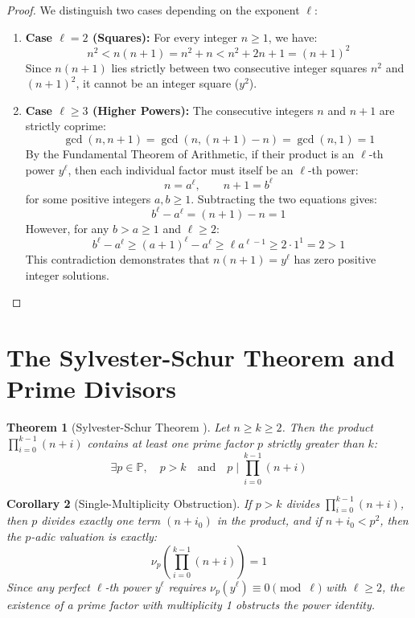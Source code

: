 \documentclass[11pt,a4paper]{article}
\newtheorem{theorem}{Theorem}[section]
\newtheorem{corollary}[theorem]{Corollary}
\theoremstyle{definition}
\begin{document}
\begin{proof}
We distinguish two cases depending on the exponent $\ell$:
\begin{enumerate}
    \item \textbf{Case $\ell = 2$ (Squares):}
    For every integer $n \ge 1$, we have:
    \[ n^2 < n(n + 1) = n^2 + n < n^2 + 2n + 1 = (n + 1)^2 \]
    Since $n(n + 1)$ lies strictly between two consecutive integer squares $n^2$ and $(n + 1)^2$, it cannot be an integer square ($y^2$).
    
    \item \textbf{Case $\ell \ge 3$ (Higher Powers):}
    The consecutive integers $n$ and $n + 1$ are strictly coprime:
    \[ \gcd(n, n + 1) = \gcd(n, (n + 1) - n) = \gcd(n, 1) = 1 \]
    By the Fundamental Theorem of Arithmetic, if their product is an $\ell$-th power $y^\ell$, then each individual factor must itself be an $\ell$-th power:
    \[ n = a^\ell, \qquad n + 1 = b^\ell \]
    for some positive integers $a, b \ge 1$.
    Subtracting the two equations gives:
    \[ b^\ell - a^\ell = (n + 1) - n = 1 \]
    However, for any $b > a \ge 1$ and $\ell \ge 2$:
    \[ b^\ell - a^\ell \ge (a + 1)^\ell - a^\ell \ge \ell a^{\ell - 1} \ge 2 \cdot 1^1 = 2 > 1 \]
    This contradiction demonstrates that $n(n + 1) = y^\ell$ has zero positive integer solutions.
\end{enumerate}
\end{proof}

\section{The Sylvester-Schur Theorem and Prime Divisors}

\begin{theorem}[Sylvester-Schur Theorem \cite{sylvester1892, schur1929}]\label{thm:sylvester_schur}
Let $n \ge k \ge 2$. Then the product $\prod_{i=0}^{k-1} (n + i)$ contains at least one prime factor $p$ strictly greater than $k$:
\begin{equation}\label{eq:ss_prime}
\exists p \in \mathbb{P}, \quad p > k \quad \text{and} \quad p \mid \prod_{i=0}^{k-1} (n + i)
\end{equation}
\end{theorem}

\begin{corollary}[Single-Multiplicity Obstruction]\label{cor:single_mult}
If $p > k$ divides $\prod_{i=0}^{k-1} (n + i)$, then $p$ divides exactly one term $(n + i_0)$ in the product, and if $n + i_0 < p^2$, then the $p$-adic valuation is exactly:
\begin{equation}\label{eq:padic_one}
\nu_p\left( \prod_{i=0}^{k-1} (n + i) \right) = 1
\end{equation}
Since any perfect $\ell$-th power $y^\ell$ requires $\nu_p(y^\ell) \equiv 0 \pmod \ell$ with $\ell \ge 2$, the existence of a prime factor with multiplicity 1 obstructs the power identity.
\end{corollary}
\end{document}
